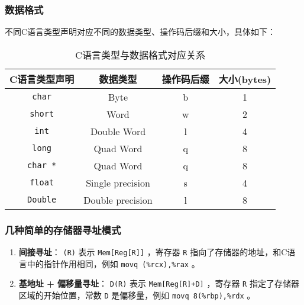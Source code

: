 \subsubsection{数据格式}
不同C语言类型声明对应不同的数据类型、操作码后缀和大小，具体如下：
\begin{table}[H]
    \captionsetup{skip=4pt}
    \centering
    \setlength{\arrayrulewidth}{1pt}
    \begin{tabular}{cccc}
        \hline
        C语言类型声明                & 数据类型             & 操作码后缀 & 大小(bytes) \\
        \hline
        \texttt{char}   & Byte             & b     & 1         \\
        \texttt{short}  & Word             & w     & 2         \\
        \texttt{int}    & Double Word      & l     & 4         \\
        \texttt{long}   & Quad Word        & q     & 8         \\
        \texttt{char *} & Quad Word        & q     & 8         \\
        \texttt{float}  & Single precision & s     & 4         \\
        \texttt{Double} & Double precision & l     & 8         \\
        \hline
    \end{tabular}
    \caption{C语言类型与数据格式对应关系}
\end{table}
\subsubsection{几种简单的存储器寻址模式}
\begin{enumerate}[label=\arabic*.]
    \item \textbf{间接寻址}： \texttt{(R)} 表示 \texttt{Mem[Reg[R]]} ，寄存器 \texttt{R} 指向了存储器的地址，和C语言中的指针作用相同，例如 \texttt{movq (\%rcx),\%rax} 。
    \item \textbf{基地址 + 偏移量寻址}： \texttt{D(R)} 表示 \texttt{Mem[Reg[R]+D]} ，寄存器 \texttt{R} 指定了存储器区域的开始位置，常数 \texttt{D} 是偏移量，例如 \texttt{movq 8(\%rbp),\%rdx} 。
\end{enumerate}
